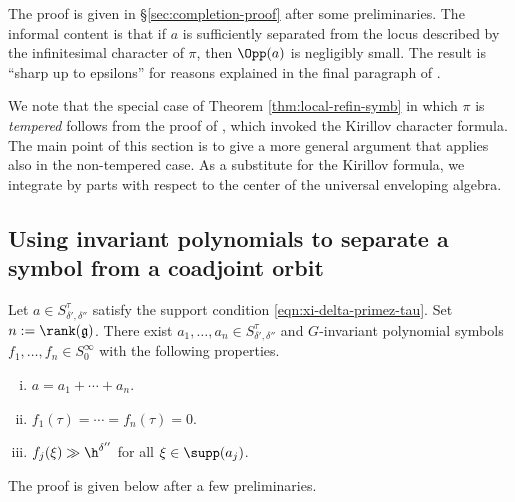 The proof is given in \S\ref{sec:completion-proof} after some preliminaries.  The informal content is that if $a$ is sufficiently separated from the locus described by the infinitesimal character of $\pi$, then $\Opp(a)$ is negligibly small.  The result is ``sharp up to epsilons'' for reasons explained in the final paragraph of \cite[\S2.4]{2020arXiv201202187N} .

We note that the special case of Theorem \ref{thm:local-refin-symb} in which $\pi$ is \emph{tempered} follows from the proof of \cite[Lemma 14.3]{2020arXiv201202187N}, which invoked the Kirillov character formula.  The main point of this section is to give a more general argument that applies also in the non-tempered case.  As a substitute for the Kirillov formula, we integrate by parts with respect to the center of the universal enveloping algebra.


\subsection{Using invariant polynomials to separate a symbol from a coadjoint orbit}
\label{sec:}
\begin{proposition}\label{lem:produce-inv-polynomials-large-on-symbol-support}
  Let $a \in S^\tau_{\delta ', \delta ''}$ satisfy the support condition \eqref{eqn:xi-delta-primez-tau}.  Set $n := \rank(\mathfrak{g})$.  There exist $a_1,\dotsc,a_n \in S^\tau_{\delta ', \delta''}$ and $G$-invariant polynomial symbols $f_1,\dotsc,f_n \in S^\infty_0$ with the following properties.
  \begin{enumerate}[(i)]
  \item $a = a_1 + \dotsb + a_n$.
  \item $f_1(\tau) = \dotsb = f_n(\tau) = 0$.
  \item $f_j(\xi) \gg \h^{\delta ''}$ for all $\xi \in \supp(a_j)$.
  \end{enumerate}
\end{proposition}
The proof is given below after a few preliminaries.


